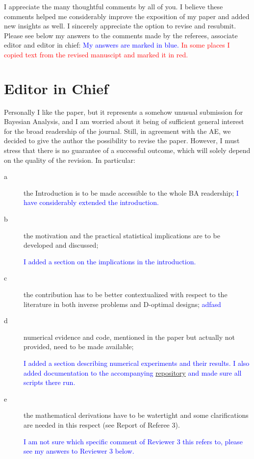\documentclass{amsart}
\newcommand{\paste}[1]{\vskip 0.05in \textcolor{red}{#1}\vskip 0.05in}
\newcommand{\answer}[1]{\vskip 0.05in \textcolor{blue}{#1} \vskip 0.05in}
\begin{document}
I appreciate the many thoughtful comments by all of you. I believe
these comments helped me considerably improve the exposition of my
paper and added new insights as well. I sincerely appreciate the
option to revise and resubmit. Please see below my answers to the
comments made by the referees, associate editor and editor in chief:
\answer{My answers are marked in blue.} \paste{In some places I
  copied text from the revised manuscipt and marked it in red.}



\section{Editor in Chief}
Personally I like the paper, but it represents a somehow unusual
submission for Bayesian Analysis, and I am worried about it being of
sufficient general interest for the broad readership of the
journal. Still, in agreement with the AE, we decided to give the
author the possibility to revise the paper. However, I must stress
that there is no guarantee of a successful outcome, which will solely
depend on the quality of the revision. In particular:

\begin{description}
  \item[a] the Introduction is to be made accessible to the whole BA
    readership;
    \answer{I have considerably extended the introduction.}
    
  \item[b] the motivation and the practical statistical implications
    are to be developed and discussed;

    \answer{I added a section on the implications in the
      introduction.}
    
  \item[c] the contribution has to be better contextualized with
    respect to the literature in both inverse problems and D-optimal
    designs;
  \answer{adfasd}
    
  \item[d] numerical evidence and code, mentioned in the paper but
    actually not provided, need to be made available;

    \answer{I added a section describing numerical experiments and
    their results. I also added documentation to the accompanying
    \href{https://github.com/yairdaon/OED}{repository} and made sure
    all scripts there run.}
    
  \item[e] the mathematical derivations have to be watertight and some
    clarifications are needed in this respect (see Report of Referee
    3).

    \answer{I am not sure which specific comment of Reviewer 3 this
    refers to, please see my answers to Reviewer 3 below. }
\end{description}
\end{document}
